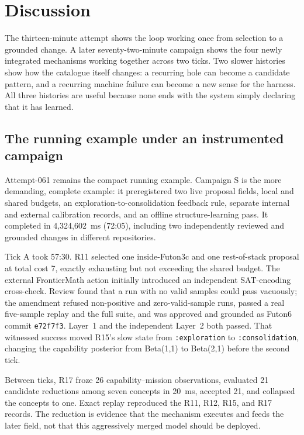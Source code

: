 \section{Discussion}\label{sec:discussion-patterns}

The thirteen-minute attempt shows the loop working once from selection to a
grounded change.  A later seventy-two-minute campaign shows the four newly
integrated mechanisms working together across two ticks.  Two slower histories
show how the catalogue itself changes: a recurring hole can become a candidate
pattern, and a recurring machine failure can become a new sense for the
harness.  All three histories are useful because none ends with the system
simply declaring that it has learned.

\subsection{The running example under an instrumented campaign}

Attempt-061 remains the compact running example.  Campaign S is
the more demanding, complete example: it preregistered two live proposal
fields, local and shared budgets, an exploration-to-consolidation feedback
rule, separate internal and external calibration records, and an offline
structure-learning pass.  It completed in 4,324,602~ms (72:05), including two
independently reviewed and grounded changes in different repositories.

Tick A took 57:30.  R11 selected one inside-Futon3c and one rest-of-stack
proposal at total cost 7, exactly exhausting but not exceeding the shared
budget.  The external FrontierMath action initially introduced an independent
SAT-encoding cross-check.  Review found that a run with no valid samples could
pass vacuously; the amendment refused non-positive and zero-valid-sample runs,
passed a real five-sample replay and the full suite, and was approved and
grounded as Futon6 commit \texttt{e72f7f3}.  Layer~1 and the independent
Layer~2 both passed.  That witnessed success moved R15's slow state from
\texttt{:exploration} to \texttt{:consolidation}, changing the capability
posterior from Beta(1,1) to Beta(2,1) before the second tick.

Between ticks, R17 froze 26 capability--mission observations, evaluated 21
candidate reductions among seven concepts in 20~ms, accepted 21, and collapsed
the concepts to one.  Exact replay reproduced the R11, R12, R15, and R17
records.  The reduction is evidence that the mechanism executes and feeds the
later field, not that this aggressively merged model should be deployed.

